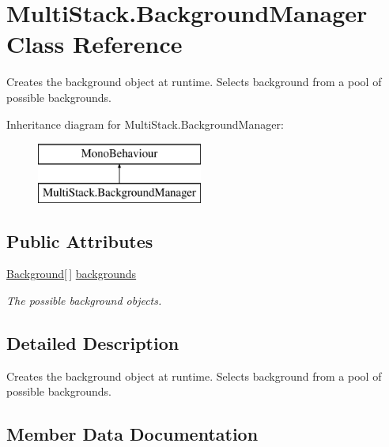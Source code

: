 \hypertarget{class_multi_stack_1_1_background_manager}{}\section{Multi\+Stack.\+Background\+Manager Class Reference}
\label{class_multi_stack_1_1_background_manager}


Creates the background object at runtime. Selects background from a pool of possible backgrounds.  


Inheritance diagram for Multi\+Stack.\+Background\+Manager\+:\begin{figure}[H]
\begin{center}
\leavevmode
\includegraphics[height=2.000000cm]{class_multi_stack_1_1_background_manager}
\end{center}
\end{figure}
\subsection*{Public Attributes}
\begin{DoxyCompactItemize}
\item 
\hyperlink{struct_multi_stack_1_1_background}{Background}\mbox{[}$\,$\mbox{]} \hyperlink{class_multi_stack_1_1_background_manager_a44be514f6a5699866194bd0d28c6deaf}{backgrounds}
\begin{DoxyCompactList}\small\item\em The possible background objects. \end{DoxyCompactList}\end{DoxyCompactItemize}


\subsection{Detailed Description}
Creates the background object at runtime. Selects background from a pool of possible backgrounds. 



\subsection{Member Data Documentation}
\hypertarget{class_multi_stack_1_1_background_manager_a44be514f6a5699866194bd0d28c6deaf}{}
